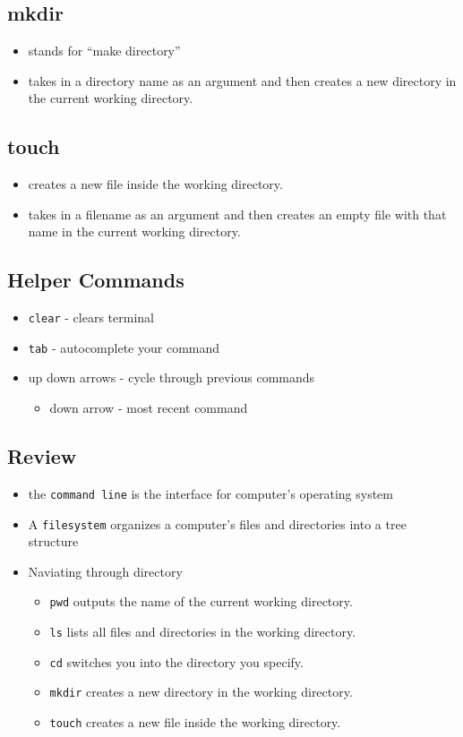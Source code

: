 \documentclass[12pt]{article}
\begin{document}
\subsection{mkdir}
\begin{itemize}
    \item stands for “make directory”
    \item takes in a directory name as an argument and then creates a new directory in the current working directory.
\end{itemize}

\subsection{touch}
\begin{itemize}
    \item creates a new file inside the working directory.
    \item takes in a filename as an argument and then creates an empty file with that name in the current working directory.
\end{itemize}

\subsection{Helper Commands}
\begin{itemize}
    \item \texttt{clear} - clears terminal
    \item \texttt{tab} - autocomplete your command
    \item up down arrows - cycle through previous commands
    \begin{itemize}
        \item down arrow - most recent command
    \end{itemize}
\end{itemize}

\subsection{Review}
\begin{itemize}
    \item the \texttt{command line} is the interface for computer's operating system
    \item A \texttt{filesystem} organizes a computer’s files and directories into a tree structure
    \item Naviating through directory
    \begin{itemize}
        \item \texttt{pwd} outputs the name of the current working directory.
        \item \texttt{ls} lists all files and directories in the working directory.
        \item \texttt{cd} switches you into the directory you specify.
        \item \texttt{mkdir} creates a new directory in the working directory.
        \item \texttt{touch} creates a new file inside the working directory.
    \end{itemize}
\end{itemize}
\end{document}
